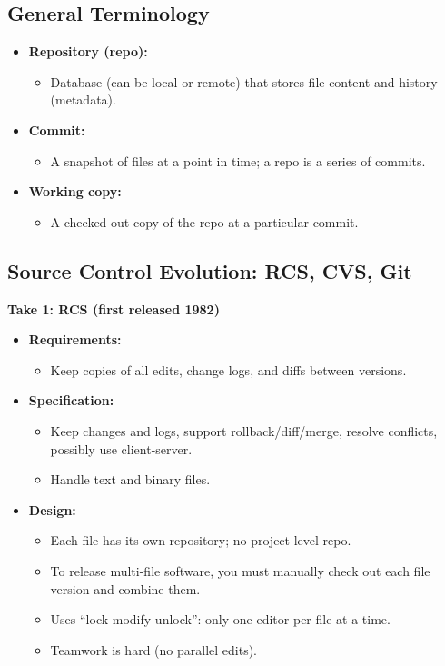 \documentclass[11pt,a4paper]{article}
\begin{document}
\subsection*{General Terminology}
\begin{itemize}
    \item \textbf{Repository (repo):}
        \begin{itemize}
            \item Database (can be local or remote) that stores file content and history (metadata).
        \end{itemize}
    \item \textbf{Commit:}
        \begin{itemize}
            \item A snapshot of files at a point in time; a repo is a series of commits.
        \end{itemize}
    \item \textbf{Working copy:}
        \begin{itemize}
            \item A checked-out copy of the repo at a particular commit.
        \end{itemize}
\end{itemize}

\subsection*{Source Control Evolution: RCS, CVS, Git}
\textbf{Take 1: RCS (first released 1982)}
\begin{itemize}
    \item \textbf{Requirements:}
        \begin{itemize}
            \item Keep copies of all edits, change logs, and diffs between versions.
        \end{itemize}
    \item \textbf{Specification:}
        \begin{itemize}
            \item Keep changes and logs, support rollback/diff/merge, resolve conflicts, possibly use client-server.
            \item Handle text and binary files.
        \end{itemize}
    \item \textbf{Design:}
        \begin{itemize}
            \item Each file has its own repository; no project-level repo.
            \item To release multi-file software, you must manually check out each file version and combine them.
            \item Uses ``lock-modify-unlock'': only one editor per file at a time.
            \item Teamwork is hard (no parallel edits).
        \end{itemize}
\end{itemize}
\end{document}

